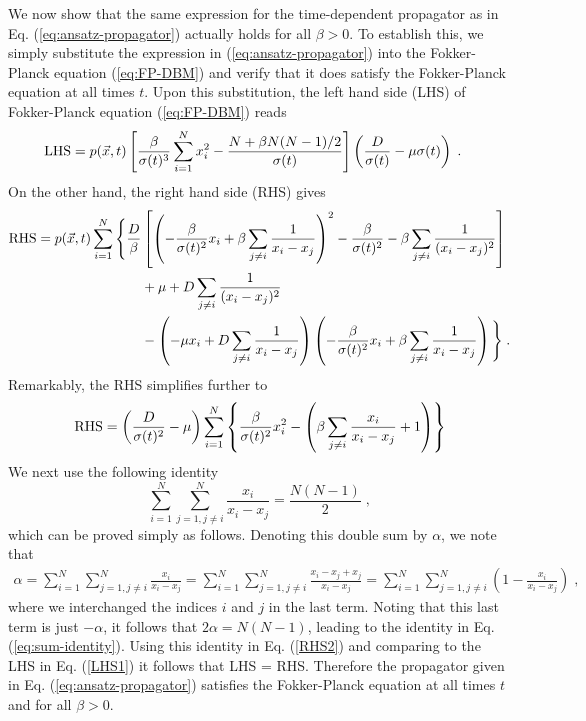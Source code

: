 \documentclass[onecolumn,superscriptaddress,
 amsmath,amssymb,
 aps,
 prd,
]{revtex4-1}
\newcommand{\bea}{\begin{eqnarray}}
\newcommand{\eea}{\end{eqnarray}}
\begin{document}
\begin{appendix}
We now show that the same expression for the time-dependent propagator as in Eq. (\ref{eq:ansatz-propagator}) actually holds for all $\beta > 0$. 
To establish this, we simply substitute the expression in (\ref{eq:ansatz-propagator}) into the Fokker-Planck equation (\ref{eq:FP-DBM}) and verify that it does satisfy the Fokker-Planck equation at all times $t$. Upon this substitution, the left hand side (LHS) of Fokker-Planck equation (\ref{eq:FP-DBM}) reads
%
\begin{align}\label{LHS1}
{\rm LHS} = p(\vec{x}, t) \left[ \frac{\beta}{\sigma(t)^3} \sum_{i = 1}^N x_i^2 - \frac{N + \beta N(N-1)/2}{\sigma(t)} \right] & \left(\frac{D}{\sigma(t)} - \mu\sigma(t)\right) \;.
\end{align}
On the other hand, the right hand side (RHS) gives
\begin{align} \label{RHS1}
{\rm RHS} = p(\vec{x}, t) \sum_{i = 1}^N \Bigg\{ \frac{D}{\beta} &\left[ \left( -\frac{\beta}{\sigma(t)^2} x_i + \beta \sum_{j \neq i} \frac{1}{x_i - x_j} \right)^2 - \frac{\beta}{\sigma(t)^2} - \beta \sum_{j \neq i} \frac{1}{(x_i - x_j)^2}  \right] \nonumber\\
&+ \mu + D \sum_{j \neq i} \frac{1}{(x_i - x_j)^2} \nonumber\\
&- \left( -\mu x_i + D \sum_{j \neq i} \frac{1}{x_i - x_j} \right)\left(-\frac{\beta}{\sigma(t)^2} x_i + \beta \sum_{j\neq i} \frac{1}{x_i - x_j} \right) \Bigg\} \;.
\end{align}
Remarkably, the RHS simplifies further to
\begin{align} \label{RHS2}
{\rm RHS} =\left(\frac{D}{\sigma(t)^2} - \mu\right) \sum_{i = 1}^N \left\{ \frac{\beta}{\sigma(t)^2} x_i^2 -  \left(\beta \sum_{j \neq i} \frac{x_i}{x_i - x_j}  + 1 \right) \right\} 
\end{align}
We next use the following identity 
\begin{equation} \label{eq:sum-identity}
\sum_{i = 1}^N \sum_{j =1,j\neq i}^N \frac{x_i}{x_i - x_j} = \frac{N(N-1)}{2} \;,
\end{equation}
which can be proved simply as follows. Denoting this double sum by $\alpha$, we note that  
\bea \label{def_alpha}
\alpha = \sum_{i = 1}^N \sum_{j =1,j\neq i}^N \frac{x_i}{x_i - x_j} =  \sum_{i = 1}^N \sum_{j =1,j\neq i}^N \frac{x_i-x_j+x_j}{x_i - x_j} =  \sum_{i = 1}^N \sum_{j =1,j\neq i}^N \left(1 - \frac{x_i}{x_i-x_j} \right)\;,
\eea
where we interchanged the indices $i$ and $j$ in the last term. Noting that this last term is just $-\alpha$, it follows that $2 \alpha = N(N-1)$, leading to the identity in Eq. (\ref{eq:sum-identity}). Using this identity in Eq. (\ref{RHS2}) and comparing to the LHS in Eq. (\ref{LHS1}) it follows that LHS = RHS. 
Therefore the propagator given in Eq. (\ref{eq:ansatz-propagator}) satisfies the Fokker-Planck equation at all times $t$ and for all $\beta > 0$. 

\end{appendix}
\end{document}
